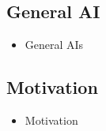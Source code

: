 \documentclass[a4paper]{article}
\begin{document}
\subsection{General AI}
\begin{itemize}
    \item General AIs
\end{itemize}
\subsection{Motivation}
\begin{itemize}
    \item Motivation
\end{itemize}



%
\end{document}
